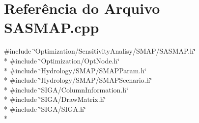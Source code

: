 \section{Referência do Arquivo S\+A\+S\+M\+A\+P.\+cpp}
\label{_s_a_s_m_a_p_8cpp}
{\ttfamily \#include \char`\"{}Optimization/\+Sensitivity\+Analisy/\+S\+M\+A\+P/\+S\+A\+S\+M\+A\+P.\+h\char`\"{}}\\*
{\ttfamily \#include \char`\"{}Optimization/\+Opt\+Node.\+h\char`\"{}}\\*
{\ttfamily \#include \char`\"{}Hydrology/\+S\+M\+A\+P/\+S\+M\+A\+P\+Param.\+h\char`\"{}}\\*
{\ttfamily \#include \char`\"{}Hydrology/\+S\+M\+A\+P/\+S\+M\+A\+P\+Scenario.\+h\char`\"{}}\\*
{\ttfamily \#include \char`\"{}S\+I\+G\+A/\+Column\+Information.\+h\char`\"{}}\\*
{\ttfamily \#include \char`\"{}S\+I\+G\+A/\+Draw\+Matrix.\+h\char`\"{}}\\*
{\ttfamily \#include \char`\"{}S\+I\+G\+A/\+S\+I\+G\+A.\+h\char`\"{}}\\*
